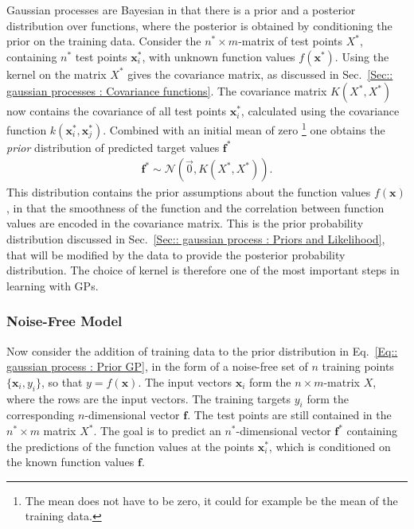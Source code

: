\documentclass[twoside,english]{uiofysmaster}
\begin{document}
Gaussian processes are Bayesian in that there is a prior and a posterior distribution over functions, where the posterior is obtained by conditioning the prior on the training data. Consider the $n^* \times m$-matrix of test points $X^*$, containing $n^*$ test points $\textbf{x}_i^*$, with unknown function values $f(\textbf{x}^*)$. Using the kernel on the matrix $X^*$ gives the covariance matrix, as discussed in Sec.~\ref{Sec:: gaussian processes : Covariance functions}. The covariance matrix $K(X^*, X^*)$ now contains the covariance of all test points $\textbf{x}^*_i$, calculated using the covariance function $k(\textbf{x}_i^*, \textbf{x}_j^*)$. Combined with an initial mean of zero \footnote{The mean does not have to be zero, it could for example be the mean of the training data.} one obtains the \textit{prior} distribution of predicted target values $\textbf{f}^*$
\begin{align}
\textbf{f}^* \sim \mathcal{N} (\vec{0}, K(X^*, X^*)).\label{Eq:: gaussian process : Prior GP}
\end{align} 
This distribution contains the prior assumptions about the function values $f(\textbf{x})$, in that the smoothness of the function and the correlation between function values are encoded in the covariance matrix. This is the prior probability distribution discussed in Sec.~\ref{Sec:: gaussian process : Priors and Likelihood}, that will be modified by the data to provide the posterior probability distribution. The choice of kernel is therefore one of the most important steps in learning with GPs. 

\subsubsection{Noise-Free Model}

Now consider the addition of training data to the prior distribution in Eq.~\ref{Eq:: gaussian process : Prior GP}, in the form of a noise-free set of $n$ training points $\{\textbf{x}_i, y_i\}$, so that $y = f(\textbf{x})$. The input vectors $\textbf{x}_i$ form the $n \times m$-matrix $X$, where the rows are the input vectors. The training targets $y_i$ form the corresponding $n$-dimensional vector $\textbf{f}$. The test points are still contained in the $n^* \times m$ matrix $X^*$. The goal is to predict an $n^*$-dimensional vector $\textbf{f}^*$ containing the predictions of the function values at the points $\textbf{x}^*_i$, which is conditioned on the known function values $\textbf{f}$. 
\end{document}
